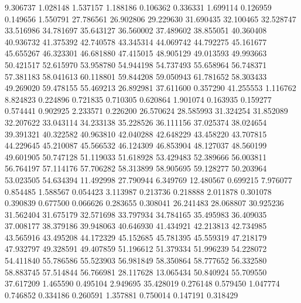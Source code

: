 9.306737
1.028148
1.537157
1.188186
0.106362
0.336331
1.699114
0.126959
0.149656
1.550791
27.786561
26.902806
29.229630
31.690435
32.100465
32.528747
33.516986
34.781697
35.643127
36.560002
37.489602
38.855051
40.360408
40.936732
41.375392
42.740578
43.345314
44.069742
44.792275
45.161677
45.655267
46.323301
46.681880
47.415015
48.905129
49.013593
49.993663
50.421517
52.615970
53.958780
54.944198
54.737493
55.658964
56.748371
57.381183
58.041613
60.118801
59.844208
59.050943
61.781652
58.303433
49.269020
59.478155
55.469213
26.892981
37.611600
0.357290
41.255553
1.116762
8.824823
0.224896
0.721835
0.710305
0.620864
1.901074
0.163935
0.159277
0.574441
0.902925
2.233571
0.226200
26.570624
28.585993
31.324254
31.852089
32.207622
33.043114
34.233138
35.228526
36.111156
37.025374
38.024654
39.391321
40.322582
40.963810
42.040288
42.648229
43.458220
43.707815
44.229645
45.210087
45.566532
46.124309
46.853904
48.127037
48.560199
49.601905
50.747128
51.119033
51.618928
53.429483
52.389666
56.003811
56.764197
57.114176
57.706282
58.313899
58.905695
59.128277
50.203964
53.023505
54.634394
11.492998
27.790944
6.349769
12.480567
0.699215
7.976077
0.854485
1.588567
0.054423
3.113987
0.213736
0.218888
2.011878
0.301078
0.390839
0.677500
0.066626
0.283655
0.308041
26.241483
28.068807
30.925236
31.562404
31.675179
32.571698
33.797934
34.784165
35.495983
36.409035
37.008177
38.379186
39.948063
40.646930
41.434921
42.213813
42.734985
43.565916
43.495208
44.172329
45.152685
45.781395
45.559319
47.218179
47.932797
49.328591
49.407859
51.196612
51.379334
51.996239
54.228072
54.411840
55.786586
55.523903
56.981849
58.350864
58.777652
56.332580
58.883745
57.514844
56.766981
28.117628
13.065434
50.840924
55.709550
37.617209
1.465590
0.495104
2.949695
35.428019
0.276148
0.579450
1.047774
0.746852
0.334186
0.260591
1.357881
0.750014
0.147191
0.318429
